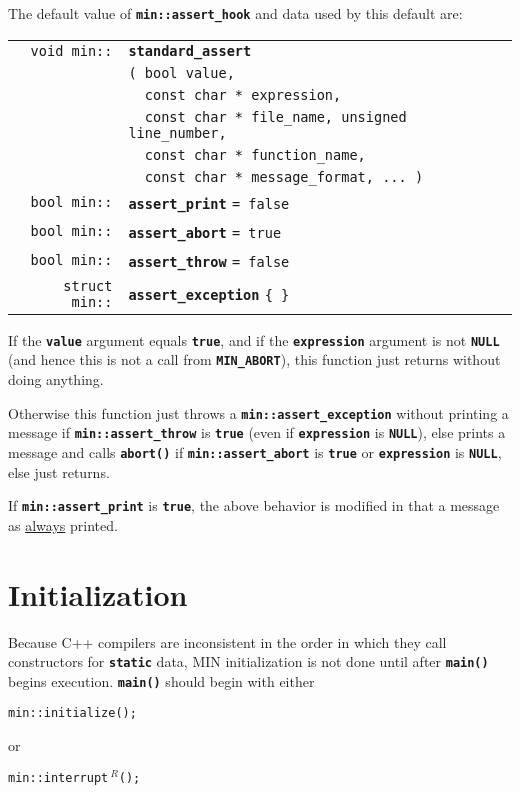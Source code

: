 \documentclass[12pt]{article}
\makeatletter
\newcommand{\TT}[1]{{\tt \bfseries #1}}
\newcommand{\ttindex}[1]{\index{#1@{\tt #1}}}
\newcommand{\EOL}{\penalty \exhyphenpenalty}
\newenvironment{indpar}[1][0.3in]%
	{\begin{list}{}%
		     {\setlength{\itemsep}{0in}%
		      \setlength{\topsep}{0in}%
		      \setlength{\parsep}{1ex}%
		      \setlength{\labelwidth}{#1}%
		      \setlength{\leftmargin}{#1}%
		      \addtolength{\leftmargin}{\labelsep}}%
	 \item}%
	{\end{list}}
\newcommand{\LABEL}[1]{\label{#1}}
\newlength{\ARGBREAKLENGTH}
\newcommand{\ARGBREAK}[1][\ARGBREAKLENGTH]{\\&\hspace*{#1}}
\newcommand{\MINKEY}[1]%
	   {\TT{#1}\ttindex{min::#1}\ttindex{#1}}
\newcommand{\REL}{$\,^R$}
\makeatother
\begin{document}
The default value of \TT{min::assert\_hook} and data
used by this default are:

\begin{indpar}\begin{tabular}{r@{}l}
\verb|void min::| & \MINKEY{standard\_assert}\ARGBREAK
    \verb|( bool value,|\ARGBREAK
    \verb|  const char * expression,|\ARGBREAK
    \verb|  const char * file_name, unsigned line_number,|\ARGBREAK
    \verb|  const char * function_name,|\ARGBREAK
    \verb|  const char * message_format, ... )|
\LABEL{MIN::STANDARD_ASSERT} \\
\verb|bool min::| & \MINKEY{assert\_print} \verb|= false|
\LABEL{MIN::ASSERT_PRINT} \\
\verb|bool min::| & \MINKEY{assert\_abort} \verb|= true|
\LABEL{MIN::ASSERT_ABORT} \\
\verb|bool min::| & \MINKEY{assert\_throw} \verb|= false|
\LABEL{MIN::ASSERT_THROW} \\
\verb|struct min::| & \MINKEY{assert\_exception} \verb|{ }|
\LABEL{MIN::ASSERT_EXCEPTION} \\
\end{tabular}\end{indpar}

If the \TT{value} argument equals \TT{true},
and if the \TT{expression} argument is not \TT{NULL}
(and hence this is not a call from \TT{MIN\_\EOL ABORT}),
this function just returns without doing anything.

Otherwise this function
just throws a \TT{min::\EOL assert\_\EOL exception} without
printing a message if \TT{min::\EOL assert\_\EOL throw} is \TT{true}
(even if \TT{expression} is \TT{NULL}),
else prints a message and calls \TT{abort()} if
\TT{min::\EOL assert\_\EOL abort} is \TT{true} or
\TT{expression} is \TT{NULL}, else just returns.

If \TT{min::assert\_print} is \TT{true}, the above behavior is
modified in that a message as \underline{always} printed.

\section{Initialization}

Because C++ compilers are inconsistent in the order in which they
call constructors for \TT{static} data, MIN initialization is
not done until after \TT{main()} begins execution.  \TT{main()}
should begin with either
\begin{center}
\tt min::initialize();
\end{center}
or
\begin{center}
\tt min::interrupt\REL();
\end{center}
\end{document}
